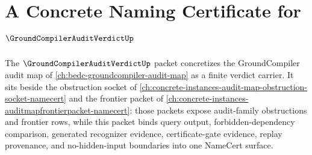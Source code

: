 \chapter{A Concrete Naming Certificate for $\GroundCompilerAuditVerdictUp$}
\label{ch:concrete-instances-groundcompilerauditverdict-namecert}

The $\GroundCompilerAuditVerdictUp$ packet concretizes the GroundCompiler audit map of \autoref{ch:bedc-groundcompiler-audit-map} as a finite verdict carrier. It sits beside the obstruction socket of \autoref{ch:concrete-instances-audit-map-obstruction-socket-namecert} and the frontier packet of \autoref{ch:concrete-instances-auditmapfrontierpacket-namecert}: those packets expose audit-family obstructions and frontier rows, while this packet binds query output, forbidden-dependency comparison, generated recognizer evidence, certificate-gate evidence, replay provenance, and no-hidden-input boundaries into one NameCert surface.

